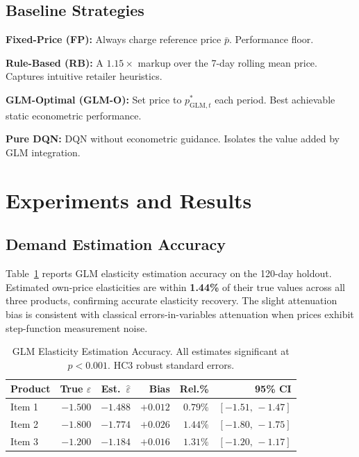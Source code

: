 \documentclass[journal, 10pt, twoside]{IEEEtran}
\begin{document}
\subsection{Baseline Strategies}

\textbf{Fixed-Price (FP):} Always charge reference price $\bar{p}$.
Performance floor.

\textbf{Rule-Based (RB):} A $1.15\times$ markup over the 7-day rolling
mean price. Captures intuitive retailer heuristics.

\textbf{GLM-Optimal (GLM-O):} Set price to $p^*_{\text{GLM},t}$ each
period. Best achievable static econometric performance.

\textbf{Pure DQN:} DQN without econometric guidance. Isolates the value
added by GLM integration.

\section{Experiments and Results}
\label{sec:results}

\subsection{Demand Estimation Accuracy}

Table~\ref{tab:elasticity_results} reports GLM elasticity estimation
accuracy on the 120-day holdout. Estimated own-price elasticities are
within \textbf{1.44\%} of their true values across all three products,
confirming accurate elasticity recovery. The slight attenuation bias is
consistent with classical errors-in-variables attenuation when prices
exhibit step-function measurement noise.

\begin{table}[H]
\centering
\caption{GLM Elasticity Estimation Accuracy. All estimates significant
at $p < 0.001$. HC3 robust standard errors.}
\label{tab:elasticity_results}
\begin{tabular}{lrrrrr}
\toprule
\textbf{Product} & \textbf{True $\varepsilon$} & \textbf{Est.\ $\hat\varepsilon$}
  & \textbf{Bias} & \textbf{Rel.\%} & \textbf{95\% CI}\\
\midrule
Item 1 & $-1.500$ & $-1.488$ & $+0.012$ & $0.79\%$ & $[-1.51,\,-1.47]$\\
Item 2 & $-1.800$ & $-1.774$ & $+0.026$ & $1.44\%$ & $[-1.80,\,-1.75]$\\
Item 3 & $-1.200$ & $-1.184$ & $+0.016$ & $1.31\%$ & $[-1.20,\,-1.17]$\\
\bottomrule
\end{tabular}
\end{table}
\end{document}
